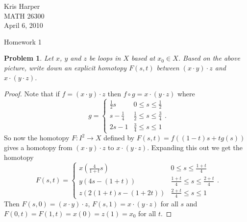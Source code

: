 \documentclass{article}
\newtheorem{problem}{Problem}
\begin{document}
\begin{flushright}
Kris Harper\\

MATH 26300\\

April 6, 2010
\end{flushright}

\begin{center}
Homework 1
\end{center}

\begin{problem}
Let $x$, $y$ and $z$ be loops in $X$ based at $x_0 \in X$. Based on the above picture, write down an explicit homotopy $F(s,t)$ between $(x \cdot y) \cdot z$ and $x \cdot (y \cdot z)$.
\end{problem}
\begin{proof}
Note that if $f = (x \cdot y) \cdot z$ then $f \circ g = x \cdot (y \cdot z)$ where
\[
g =
\begin{cases}
\frac{1}{2}s & 0 \leq s \leq \frac{1}{2}\\
s - \frac{1}{4} & \frac{1}{2} \leq s \leq \frac{3}{4}\\
2s - 1 & \frac{3}{4} \leq s \leq 1
\end{cases}.
\]
So now the homotopy $F : I^2 \to X$ defined by $F(s,t) = f((1-t)s + tg(s))$ gives a homotopy from $(x \cdot y) \cdot z$ to $x \cdot (y \cdot z)$. Expanding this out we get the homotopy
\[
F(s,t) =
\begin{cases}
x \left ( \frac{4}{1+t} s \right ) & 0 \leq s \leq \frac{1+t}{4}\\
y (4s - (1+t)) & \frac{1+t}{4} \leq s \leq \frac{2+t}{4}\\
z (2(1+t)s - (1+2t)) & \frac{2+t}{4} \leq s \leq 1
\end{cases}.
\]
Then $F(s,0) = (x \cdot y) \cdot z$, $F(s,1) = x \cdot (y \cdot z)$ for all $s$ and $F(0,t) = F(1,t) = x(0) = z(1) = x_0$ for all $t$.
\end{proof}
\end{document}
